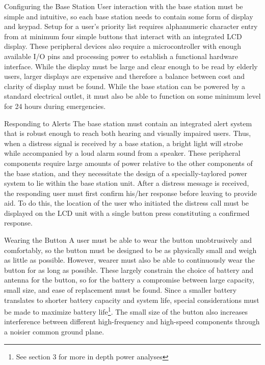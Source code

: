\documentclass[journal,compsoc]{IEEEtran}
\begin{document}
\begin{LaTeXdescription}
\item[Configuring the Base Station] User interaction with the base station must be simple and intuitive, so each base station needs to contain some form of display and keypad.  Setup for a user's priority list requires alphanumeric character entry from at minimum four simple buttons that interact with an integrated LCD display. These peripheral devices also require a microcontroller with enough available I/O pins and processing power to establish a functional hardware interface.  While the display must be large and clear enough to be read by elderly users, larger displays are expensive and therefore a balance between cost and clarity of display must be found. While the base station can be powered by a standard electrical outlet, it must also be able to function on some minimum level for 24 hours during emergencies.
\item[Responding to Alerts] The base station must contain an integrated alert system that is robust enough to reach both hearing and visually impaired users.  Thus, when a distress signal is received by a base station, a bright light will strobe while accompanied by a loud alarm sound from a speaker.  These peripheral components require large amounts of power relative to the other components of the base station, and they necessitate the design of a specially-taylored power system to lie within the base station unit.  After a distress message is received, the responding user must first confirm his/her response before leaving to provide aid. To do this, the location of the user who initiated the distress call must be displayed on the LCD unit with a single button press constituting a confirmed response.
\item[Wearing the Button] A user must be able to wear the button unobtrusively and comfortably, so the button must be designed to be as physically small and weigh as little as possible.  However, wearer must also be able to continuously wear the button for as long as possible. These largely constrain the choice of battery and antenna for the button, so for the battery a compromise between large capacity, small size, and ease of replacement must be found. Since a smaller battery translates to shorter battery capacity and system life, special considerations must be made to maximize battery life\footnote{See section 3 for more in depth power analyses}. The small size of the button also increases interference between different high-frequency and high-speed components through a noisier common ground plane.

\end{LaTeXdescription}
\end{document}
